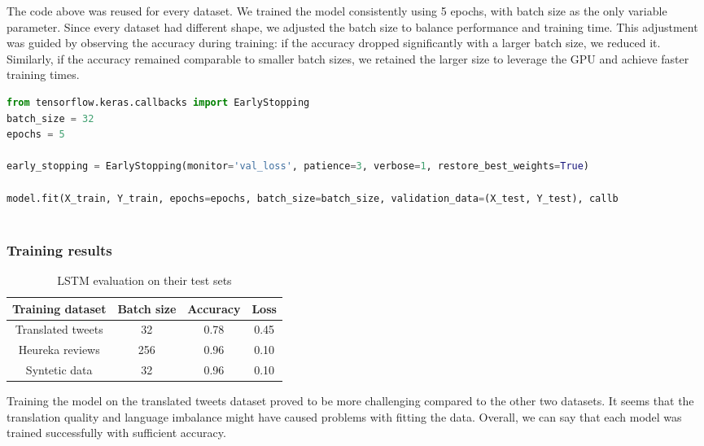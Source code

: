 \documentclass[11pt]{article}
\begin{document}
The code above was reused for every dataset. We trained the model consistently using 5 epochs, with batch size as the only variable parameter. Since every dataset had different shape, we adjusted the batch size to balance performance and training time. This adjustment was guided by observing the accuracy during training: if the accuracy dropped significantly with a larger batch size, we reduced it. Similarly, if the accuracy remained comparable to smaller batch sizes, we retained the larger size to leverage the GPU and achieve faster training times. 

\begin{lstlisting}[language=Python, caption=Fitting the model]
from tensorflow.keras.callbacks import EarlyStopping
batch_size = 32
epochs = 5

early_stopping = EarlyStopping(monitor='val_loss', patience=3, verbose=1, restore_best_weights=True)

model.fit(X_train, Y_train, epochs=epochs, batch_size=batch_size, validation_data=(X_test, Y_test), callb
    
\end{lstlisting}

\subsubsection{Training results}

\begin{table}[h!]
    \centering
    \begin{tabular}{|c|c|c|c|} %
        \hline
        \textbf{Training dataset} & \textbf{Batch size} & \textbf{Accuracy} & \textbf{Loss} \\
        \hline
        Translated tweets & 32 & 0.78 & 0.45 \\
        \hline
        Heureka reviews & 256 & 0.96 & 0.10 \\
        \hline
        Syntetic data & 32 & 0.96 & 0.10 \\
        \hline
    \end{tabular}
    \caption{LSTM evaluation on their test sets}
    \label{tab:lstm_train_eval}
\end{table}

Training the model on the translated tweets dataset proved to be more challenging compared to the other two datasets. It seems that the translation quality and language imbalance might have caused problems with fitting the data. Overall, we can say that each model was trained successfully with sufficient accuracy.
\end{document}
